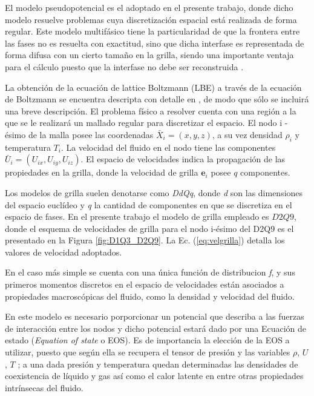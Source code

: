 El modelo pseudopotencial es el adoptado en el presente trabajo, donde dicho modelo resuelve problemas cuya discretización espacial está realizada de forma regular. Este modelo multifásico tiene la particularidad de que la frontera entre las fases no es resuelta con exactitud, sino que dicha interfase es representada de forma difusa con un cierto tamaño en la grilla, siendo una importante ventaja para el cálculo puesto que la interfase no debe ser reconstruida \cite{parrill2019reviews}.


La obtención de la ecuación de lattice Boltzmann (LBE) a través de la ecuación de Boltzmann se encuentra descripta con detalle en \cite{kruger2017lattice}, de modo que sólo se incluirá una breve descripción. El problema físico a resolver cuenta con una región a la que se le realizará un mallado regular para discretizar el espacio. El nodo i - ésimo de la malla posee las coordenadas ${\bar{X}}_{i} = (x,y,z)$, a su vez densidad $\rho_{i}$ y temperatura $T_{i}$. La velocidad del fluido en el nodo tiene las componentes ${\bar{U}}_{i} = ({U}_{ix},{U}_{iy},{U}_{iz})$. El espacio de velocidades indica la propagación de las propiedades en la grilla, donde la velocidad de grilla $\mathbf{e}_{i}$ posee $q$ componentes.

Los modelos de grilla suelen denotarse como \textit{DdQq}, donde \textit{d} son las dimensiones del espacio euclídeo y \textit{q} la cantidad de componentes en que se discretiza en el espacio de fases. En el presente trabajo el modelo de grilla empleado es $D2Q9$, donde el esquema de velocidades de grilla para el nodo i-ésimo del D2Q9 es el presentado en la Figura \ref{fig:D1Q3_D2Q9}. La Ec. (\ref{eq:velgrilla}) detalla los valores de velocidad adoptados. 

En el caso más simple se cuenta con una única función de distribucion \textit{f}, y sus primeros momentos discretos en el espacio de velocidades están asociados a propiedades macroscópicas del fluido, como la densidad y velocidad del fluido.

En este modelo es necesario porporcionar un potencial que describa a las fuerzas de interacción entre los nodos y dicho potencial estará dado por una Ecuación de estado (\textit{Equation of state} o EOS). Es de importancia la elección de la EOS a utilizar, puesto que según ella se recupera el tensor de presión y las variables $\rho$, $U$, $T$ ; a una dada presión y temperatura quedan determinadas las densidades de coexistencia de líquido y gas así como el calor latente en entre otras propiedades intrínsecas del fluido.

